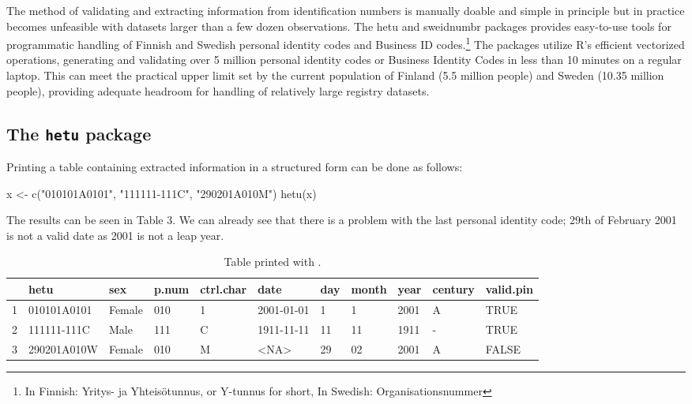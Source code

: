 The method of validating and extracting information from identification numbers is manually doable and simple in principle but in practice becomes unfeasible with datasets larger than a few dozen observations. The hetu and sweidnumbr packages provides easy-to-use tools for programmatic handling of Finnish and Swedish personal identity codes and Business ID codes.\footnote{In Finnish: Yritys- ja Yhteisötunnus, or Y-tunnus for short, In Swedish: Organisationsnummer} The packages utilize R’s efficient vectorized operations, generating and validating over 5 million personal identity codes or Business Identity Codes in less than 10 minutes on a regular laptop. This can meet the practical upper limit set by the current population of Finland (5.5 million people) and Sweden (10.35 million people), providing adequate headroom for handling of relatively large registry datasets.

\subsection{The \texttt{hetu} package}

Printing a table containing extracted information in a structured form can be done as follows:

\begin{example}
  x <- c("010101A0101", "111111-111C", "290201A010M")
  hetu(x)
\end{example}

The results can be seen in Table 3. We can already see that there is a problem with the last personal identity code; 29th of February 2001 is not a valid date as 2001 is not a leap year.

\begin{table}[ht]
\centering
\begin{tabular}{rllllllllll}
\toprule
    & hetu & sex & p.num & ctrl.char & date & day & month & year & century & valid.pin \\
  \hline
  1 & 010101A0101 & Female & 010 & 1 & 2001-01-01 & 1 & 1 & 2001 & A & TRUE \\
  2 & 111111-111C & Male & 111 & C &  1911-11-11 & 11 & 11 & 1911 & - & TRUE \\
  3 & 290201A010W & Female & 010 & M & <NA> & 29 & 02 & 2001 & A & FALSE \\
\bottomrule
\end{tabular}
\caption{Table printed with .}
\label{tab:hetuprintout}
\end{table}

